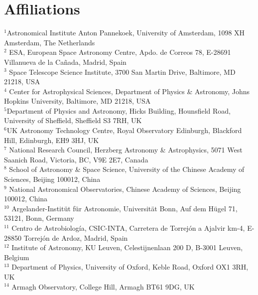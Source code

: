 \documentclass[apjl,twocolumn]{emulateapj}
\begin{document}
\section*{Affiliations}
\noindent $^{1}${Astronomical Institute Anton Pannekoek, University of
    Amsterdam, 1098 XH Amsterdam, The Netherlands} \\
  $^{2}$ {ESA, European Space Astronomy Centre, Apdo. de Correos 78,
    E-28691 Villanueva de la Ca\~nada, Madrid, Spain} \\
  $^{3}$ {Space Telescope Science Institute, 3700 San Martin Drive,
    Baltimore, MD 21218, USA}\\
  $^{4}$ {Center for Astrophysical Sciences, Department of Physics \& Astronomy, Johns Hopkins University, Baltimore, MD 21218, USA}\\
  $^{5}${Department of Physics and Astronomy, Hicks Building,
    Hounsfield Road, University of Sheffield, Sheffield S3 7RH, UK}\\
  $^{6}${UK Astronomy Technology Centre, Royal Observatory Edinburgh, Blackford Hill, Edinburgh, EH9 3HJ, UK}\\
  $^{7}$ {National Research Council, Herzberg Astronomy \&
    Astrophysics, 5071 West Saanich Road, Victoria, BC, V9E 2E7,
    Canada}\\
  $^{8}$ {School of Astronomy \& Space Science, University of the Chinese
    Academy of Sciences, Beijing 100012, China}\\
  $^{9}$ {National Astronomical Observatories, Chinese Academy of
    Sciences, Beijing 100012, China}\\
  $^{10}$ {Argelander-Instit\"ut f\"ur Astronomie, Universit\"at Bonn,
    Auf dem H\"ugel 71, 53121, Bonn, Germany}\\
  $^{11}$ {Centro de Astrobiología, CSIC-INTA, Carretera de Torrejón a Ajalvir km-4, E-28850 Torrejón de Ardoz, Madrid, Spain}\\
  $^{12}$ {Institute of Astronomy, KU Leuven, Celestijnenlaan 200 D, B-3001 Leuven, Belgium}\\
  $^{13}$ {Department of Physics, University of Oxford, Keble Road,
    Oxford OX1 3RH, UK} \\
  $^{14}$ {Armagh Observatory, College Hill, Armagh BT61 9DG, UK}\\

  
\end{document}
